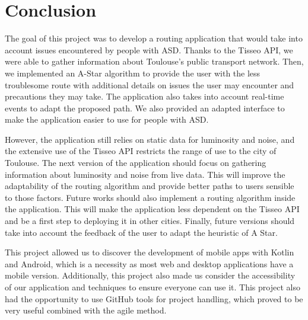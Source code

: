 \section{Conclusion}

The goal of this project was to develop a routing application that would take into account issues encountered by people with ASD. Thanks to the Tisseo API, we were able to gather information about Toulouse's public transport network. Then, we implemented an A-Star algorithm to provide the user with the less troublesome route with additional details on issues the user may encounter and precautions they may take. The application also takes into account real-time events to adapt the proposed path. We also provided an adapted interface to make the application easier to use for people with ASD.\newline

However, the application still relies on static data for luminosity and noise, and the extensive use of the Tisseo API restricts the range of use to the city of Toulouse. The next version of the application should focus on gathering information about luminosity and noise from live data. This will improve the adaptability of the routing algorithm and provide better paths to users sensible to those factors. Future works should also implement a routing algorithm inside the application. This will make the application less dependent on the Tisseo API and be a first step to deploying it in other cities. Finally, future versions should take into account the feedback of the user to adapt the heuristic of A Star.\newline

This project allowed us to discover the development of mobile apps with Kotlin and Android, which is a necessity as most web and desktop applications have a mobile version. Additionally, this project also made us consider the accessibility of our application and techniques to ensure everyone can use it. This project also had the opportunity to use GitHub tools for project handling, which proved to be very useful combined with the agile method.
\newline
